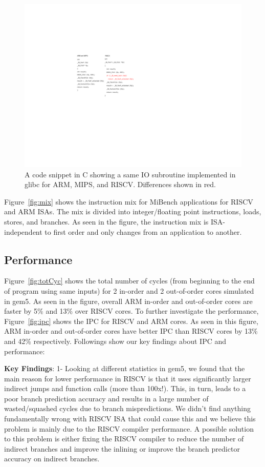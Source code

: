 \begin{figure}[]
	\centering
	\includegraphics[width=1\columnwidth]{figures/libc.pdf}
	\caption{A code snippet in C showing a same IO subroutine implemented in glibc for ARM, MIPS, and RISCV. Differences shown in red.}
	\label{fig:libc}
	\vspace{-1em}
\end{figure} 

Figure~\ref{fig:mix} shows the instruction mix for MiBench applications for RISCV and ARM ISAs. The mix is divided into integer/floating point instructions, loads, stores, and branches. As seen in the figure, the instruction mix is ISA-independent to first order and only changes from an application to another. 



\subsection{Performance}
Figure~\ref{fig:totCyc} shows the total number of cycles (from beginning to the end of program using same inputs) for 2 in-order and 2 out-of-order cores simulated in gem5. As seen in the figure, overall ARM in-order and out-of-order cores are faster by 5\% and 13\% over RISCV cores. To further investigate the performance, Figure~\ref{fig:ipc} shows the IPC for RISCV and ARM cores. As seen in this figure, ARM in-order and out-of-order cores have better IPC than RISCV cores by 13\% and 42\% respectively. Followings show our key findings about IPC and performance:

\noindent \textbf{Key Findings}: 1- Looking at different statistics in gem5, we found that the main reason for lower performance in RISCV is that it uses significantly larger indirect jumps and function calls (more than 100x!). This, in turn, leads to a poor branch prediction accuracy and results in a large number of wasted/squashed cycles due to branch mispredictions. We didn't find anything fundamentally wrong with RISCV ISA that could cause this and we believe this problem is mainly due to the RISCV compiler performance. A possible solution to this problem is either fixing the RISCV compiler to reduce the number of indirect branches and improve the inlining or improve the branch predictor accuracy on indirect branches. 

